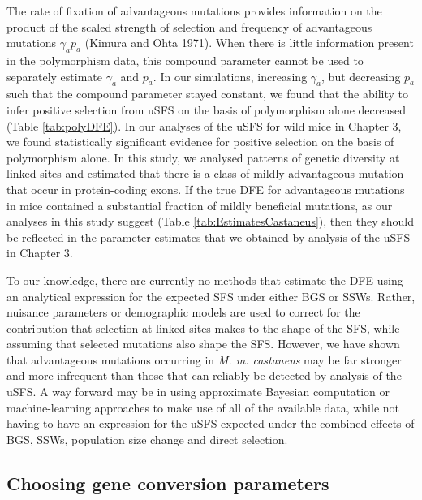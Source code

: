 {	The rate of fixation of advantageous mutations provides information on the product of the scaled strength of selection and frequency of advantageous mutations $\gamma_a p_a$ (Kimura and Ohta 1971). When there is little information present in the polymorphism data, this compound parameter cannot be used to separately estimate $\gamma_a$ and $p_a$. In our simulations, increasing $\gamma_a$, but decreasing $p_a$ such that the compound parameter stayed constant, we found that the ability to infer positive selection from uSFS on the basis of polymorphism alone decreased (Table \ref{tab:polyDFE}). In our analyses of the uSFS for wild mice in Chapter 3, we found statistically significant evidence for positive selection on the basis of polymorphism alone. In this study, we analysed patterns of genetic diversity at linked sites and estimated that there is a class of mildly advantageous mutation that occur in protein-coding exons. If the true DFE for advantageous mutations in mice contained a substantial fraction of mildly beneficial mutations, as our analyses in this study suggest (Table \ref{tab:EstimatesCastaneus}), then they should be reflected in the parameter estimates that we obtained by analysis of the uSFS in Chapter 3.

	To our knowledge, there are currently no methods that estimate the DFE using an analytical expression for the expected SFS under either BGS or SSWs. Rather, nuisance parameters or demographic models are used to correct for the contribution that selection at linked sites makes to the shape of the SFS, while assuming that selected mutations also shape the SFS. However, we have shown that advantageous mutations occurring in \textit{M. m. castaneus} may be far stronger and more infrequent than those that can reliably be detected by analysis of the uSFS. A way forward may be in using approximate Bayesian computation or machine-learning approaches to make use of all of the available data, while not having to have an expression for the uSFS expected under the combined effects of BGS, SSWs, population size change and direct selection.
		

\subsection{Choosing gene conversion parameters}

}
